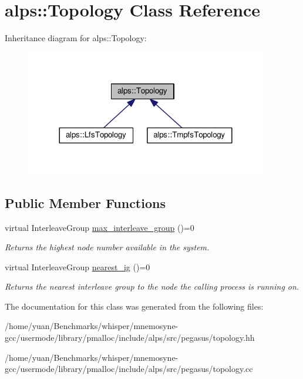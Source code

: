 \hypertarget{classalps_1_1Topology}{}\section{alps\+:\+:Topology Class Reference}
\label{classalps_1_1Topology}


Inheritance diagram for alps\+:\+:Topology\+:
\nopagebreak
\begin{figure}[H]
\begin{center}
\leavevmode
\includegraphics[width=300pt]{classalps_1_1Topology__inherit__graph}
\end{center}
\end{figure}
\subsection*{Public Member Functions}
\begin{DoxyCompactItemize}
\item 
virtual Interleave\+Group \hyperlink{classalps_1_1Topology_a90b74887b475e671e36910e5d558d169}{max\+\_\+interleave\+\_\+group} ()=0\hypertarget{classalps_1_1Topology_a90b74887b475e671e36910e5d558d169}{}\label{classalps_1_1Topology_a90b74887b475e671e36910e5d558d169}

\begin{DoxyCompactList}\small\item\em Returns the highest node number available in the system. \end{DoxyCompactList}\item 
virtual Interleave\+Group \hyperlink{classalps_1_1Topology_a213696634a781fa24f8f1b69f1c782e0}{nearest\+\_\+ig} ()=0\hypertarget{classalps_1_1Topology_a213696634a781fa24f8f1b69f1c782e0}{}\label{classalps_1_1Topology_a213696634a781fa24f8f1b69f1c782e0}

\begin{DoxyCompactList}\small\item\em Returns the nearest interleave group to the node the calling process is running on. \end{DoxyCompactList}\end{DoxyCompactItemize}


The documentation for this class was generated from the following files\+:\begin{DoxyCompactItemize}
\item 
/home/yuan/\+Benchmarks/whisper/mnemosyne-\/gcc/usermode/library/pmalloc/include/alps/src/pegasus/topology.\+hh\item 
/home/yuan/\+Benchmarks/whisper/mnemosyne-\/gcc/usermode/library/pmalloc/include/alps/src/pegasus/topology.\+cc\end{DoxyCompactItemize}

